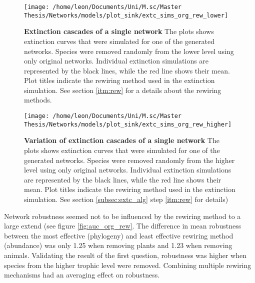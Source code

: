 \documentclass[12pt,a4paper]{article}
\begin{document}
\begin{figure}[H]
	 \texttt{[image: /home/leon/Documents/Uni/M.sc/Master Thesis/Networks/models/plot\_sink/extc\_sims\_org\_rew\_lower]}
	 \caption{\textbf{Extinction cascades of a single network} The plots shows extinction curves that were simulated for one of the generated networks. Species were removed randomly from the lower level using only original networks. Individual extinction simulations are represented by the black lines, while the red line shows their mean. Plot titles indicate the rewiring method used in the extinction simulation. See section \ref{itm:rew} for a details about the rewiring methods.}
	 \label{fig:extc_org_rew_lower}
\end{figure}


\begin{figure}[H]
	 \texttt{[image: /home/leon/Documents/Uni/M.sc/Master Thesis/Networks/models/plot\_sink/extc\_sims\_org\_rew\_higher]}
	 \caption{\textbf{Variation of extinction cascades of a single network} The plots shows extinction curves that were simulated for one of the generated networks. Species were removed randomly from the higher level using only original networks. Individual extinction simulations are represented by the black lines, while the red line shows their mean. Plot titles indicate the rewiring method used in the extinction simulation. See section \ref{subsec:extc_alg} step \ref{itm:rew} for details)}
	 \label{fig:extc_org_rew_higher}
\end{figure}

Network robustness seemed not to be influenced by the rewiring method to a large extend (see figure \ref{fig:auc_org_rew}. The difference in mean robustness between the most effective (phylogeny) and least effective rewiring method (abundance) was only 1.25 when removing plants and 1.23 when removing animals. Validating the result of the first question, robustness was higher when species from the higher trophic level were removed. Combining multiple rewiring mechanisms had an averaging effect on robustness. \\
\end{document}
